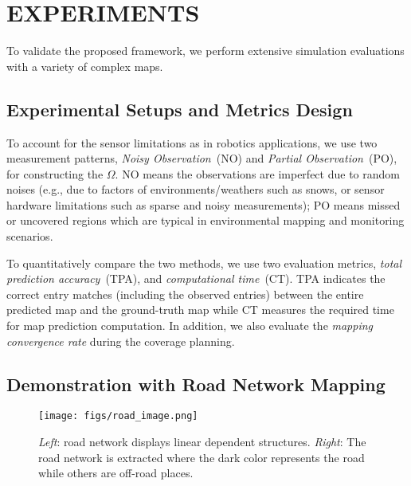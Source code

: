 \section{EXPERIMENTS}

% 
To validate the proposed framework, we perform extensive simulation evaluations with a variety of complex maps. 

\subsection{Experimental Setups and Metrics Design}

To account for the sensor limitations as in robotics applications, we use two measurement patterns, \textit{Noisy Observation}~(NO) and \textit{Partial Observation}~(PO), for constructing the $\Omega$. NO means the observations are imperfect due to random noises (e.g., due to factors of environments/weathers such as snows, or sensor hardware limitations such as sparse and noisy measurements); %
PO means missed or uncovered regions which are typical in environmental mapping and monitoring scenarios. 

To quantitatively compare the two methods,  we use two evaluation metrics, \textit{total prediction accuracy}~(TPA), and \textit{computational time}~(CT). TPA indicates the correct entry matches (including the observed entries) between the entire predicted map and the ground-truth map while CT measures the required time for map prediction computation. 
In addition, we also evaluate the \textit{mapping convergence rate} during the coverage planning.


\subsection{Demonstration with Road Network Mapping}
\begin{figure}
  \centering
  	{\label{fig:road_image}\texttt{[image: figs/road\_image.png]}}
  \caption{\small \textit{Left}: road network displays linear dependent structures.  \textit{Right}: The road network is extracted where 
  the dark color represents the road while others are off-road places.
  } 
\label{fig:road_image}  
\end{figure}

